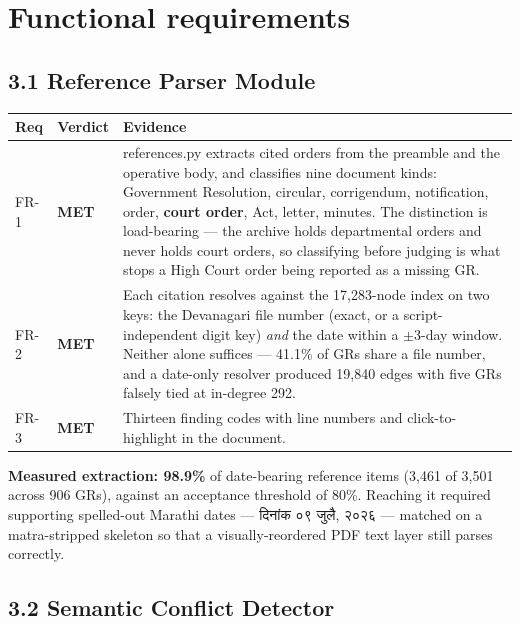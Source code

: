 \documentclass[11pt,a4paper]{article}
\newcommand{\code}[1]{{\mono\small #1}}
\newcommand{\MET}{\textcolor{ok}{\textbf{MET}}}
\begin{document}
\section{Functional requirements}

\subsection*{3.1 Reference Parser Module}

\begin{longtable}{@{}p{11mm}p{15mm}p{125mm}@{}}
\toprule
\textbf{Req} & \textbf{Verdict} & \textbf{Evidence} \\
\midrule
\endhead
FR-1 & \MET &
\code{references.py} extracts cited orders from the preamble and the operative body, and
classifies nine document kinds: Government Resolution, circular, corrigendum, notification,
order, \textbf{court order}, Act, letter, minutes. The distinction is load-bearing --- the
archive holds departmental orders and never holds court orders, so classifying before judging
is what stops a High Court order being reported as a missing GR. \\
\addlinespace
FR-2 & \MET &
Each citation resolves against the 17{,}283-node index on two keys: the Devanagari file number
(exact, or a script-independent digit key) \emph{and} the date within a $\pm$3-day window.
Neither alone suffices --- 41.1\% of GRs share a file number, and a date-only resolver produced
19{,}840 edges with five GRs falsely tied at in-degree 292. \\
\addlinespace
FR-3 & \MET &
Thirteen finding codes with line numbers and click-to-highlight in the document. \\
\bottomrule
\end{longtable}

\textbf{Measured extraction: 98.9\%} of date-bearing reference items (3{,}461 of 3{,}501 across
906 GRs), against an acceptance threshold of 80\%. Reaching it required supporting spelled-out
Marathi dates --- {\dev दिनांक ०९ जुलै, २०२६} --- matched on a matra-stripped skeleton so that a
visually-reordered PDF text layer still parses correctly.

\subsection*{3.2 Semantic Conflict Detector}
\end{document}

